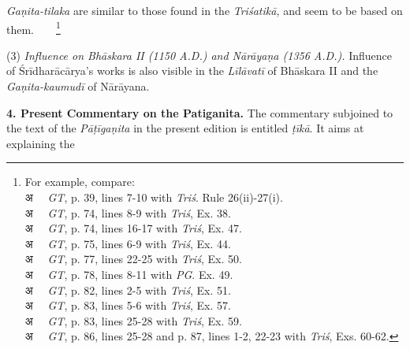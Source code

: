 \documentclass[10pt, openany]{book}
\begin{document}
{\textit{Gaṇita-tilaka }are similar to those found in the \textit{Triśatikā,} and}
{seem to be based on them.}~~~~\renewcommand{\thefootnote}{\hspace{-4.5mm} 5}\footnote{\hspace{-2mm} \englishfont For example, compare:\textendash \\

{\color{white}अ}~~ \textit{GT}, p. 39, lines 7-10 with \textit{Triś}. Rule 26(ii)-27(i). \\

{\color{white}अ}~~ \textit{GT}, p. 74, lines 8-9 with \textit{Triś}, Ex. 38. \\

{\color{white}अ}~~ \textit{GT}, p. 74, lines 16-17 with \textit{Triś}, Ex. 47. \\

{\color{white}अ}~~ \textit{GT}, p. 75, lines 6-9 with \textit{Triś}, Ex. 44. \\

{\color{white}अ}~~ \textit{GT}, p. 77, lines 22-25 with \textit{Triś}, Ex. 50. \\

{\color{white}अ}~~ \textit{GT}, p. 78, lines 8-11 with \textit{PG}. Ex. 49. \\

{\color{white}अ}~~ \textit{GT}, p. 82, lines 2-5 with \textit{Triś}, Ex. 51. \\

{\color{white}अ}~~ \textit{GT}, p. 83, lines 5-6 with \textit{Triś}, Ex. 57. \\

{\color{white}अ}~~ \textit{GT}, p. 83, lines 25-28 with \textit{Triś}, Ex. 59. \\

{\color{white}अ}~~ \textit{GT}, p. 86, lines 25-28 and p. 87, lines 1-2, 22-23 with \textit{Triś}, Exs. 60-62.}
 
\vspace{3mm}
 (3) {\textit{Influence on Bhāskara II (1150 A.D.) and Nārāyaṇa 
(1356 A.D.).}{ Influence of Śrīdharācārya's works is also visible}
{in the\textit{ Līlāvatī }of Bhāskara II and the \textit{Gaṇita-kaumudī }of}
{Nārāyana.}}
\vspace{4mm}

\textbf{4. Present Commentary on the Patiganita.} The
{commentary subjoined to the text of the \textit{Pāṭīgaṇita} in the}
{present edition is entitled \textit{ṭīkā}. It aims at explaining the}
\end{document}
